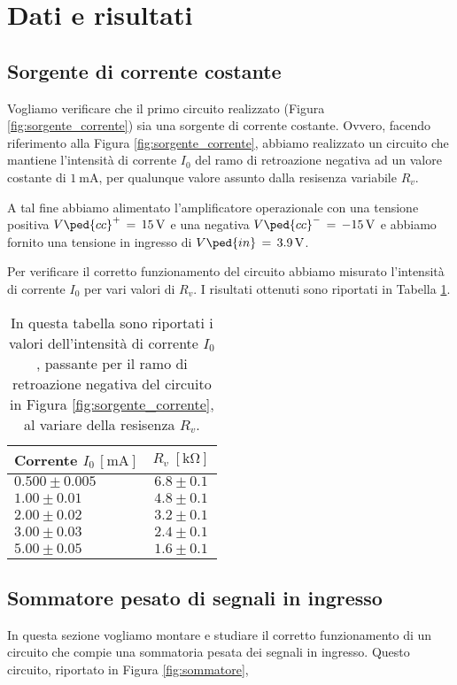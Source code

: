 \section*{Dati e risultati}

\subsection*{Sorgente di corrente costante}

Vogliamo verificare che il primo circuito realizzato (Figura \ref{fig:sorgente_corrente}) sia una sorgente di corrente costante. Ovvero, facendo riferimento alla Figura \ref{fig:sorgente_corrente}, abbiamo realizzato un circuito che mantiene l'intensità di corrente $I_0$ del ramo di retroazione negativa ad un valore costante di $\SI{1}{\milli\ampere}$, per qualunque valore assunto dalla resisenza variabile $R_v$.

A tal fine abbiamo alimentato l'amplificatore operazionale con una tensione positiva $V\ped{cc}^+\,=\,\SI{+15}{\volt}$ e una negativa $V\ped{cc}^-\,=\,\SI{-15}{\volt}$ e abbiamo fornito una tensione in ingresso di $V\ped{in}\,=\,\SI{+3.9}{\volt}$.

Per verificare il corretto funzionamento del circuito abbiamo misurato l'intensità di corrente $I_0$ per vari valori di $R_v$. I risultati ottenuti sono riportati in Tabella \ref{tab:corr_res}.


\begin{table}[H]
    \centering
    \small
    \begin{tabular}{l c}
        \toprule
		Corrente $I_0 \, [\si{\milli\ampere}]$ & $R_v \; [\si{\kilo\ohm}]$ \\
        \midrule
		$ 0.500 \pm 0.005 $ & $6.8 \pm 0.1$ \\
		$ 1.00 \pm 0.01 $ & $ 4.8 \pm 0.1$ \\
		$ 2.00 \pm 0.02 $ & $ 3.2 \pm 0.1$ \\
		$ 3.00 \pm 0.03 $ & $ 2.4 \pm 0.1$ \\
		$ 5.00 \pm 0.05 $ & $ 1.6 \pm 0.1$ \\
        \bottomrule
    \end{tabular}
    \caption{In questa tabella sono riportati i valori dell'intensità di corrente $I_0$, passante per il ramo di retroazione negativa del circuito in Figura \ref{fig:sorgente_corrente}, al variare della resisenza $R_v$. }
    \label{tab:corr_res}
\end{table}

\subsection*{Sommatore pesato di segnali in ingresso}

In questa sezione vogliamo montare e studiare il corretto funzionamento di un circuito che compie una sommatoria pesata dei segnali in ingresso. Questo circuito, riportato in Figura \ref{fig:sommatore}, 











